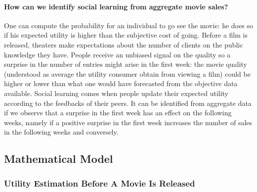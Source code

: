 \documentclass{article}
\begin{document}
\paragraph{How can we identify social learning from aggregate movie sales? }
One can compute the probability for an individual to go see the movie: he does so if his expected utility is higher than the subjective cost of going. Before a film is released, theaters make expectations about the number of clients on the public knowledge they have. People receive an unbiased signal on the quality so a surprise in the number of entries might arise in the first week: the movie quality (understood as average the utility consumer obtain from viewing a film) could be higher or lower than what one would have forecasted from the objective data available. Social learning comes when people update their expected utility according to the feedbacks of their peers. It can be identified from aggregate data if we observe that a surprise in the first week has an effect on the following weeks, namely if a positive surprise in the first week increases the number of sales in the following weeks and conversely.

\subsection{Mathematical Model}
\subsubsection{Utility Estimation Before A Movie Is Released}	
\end{document}
